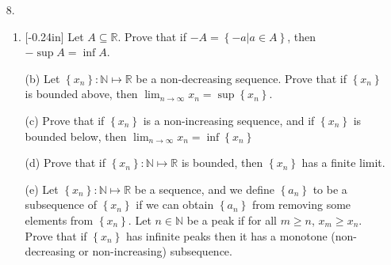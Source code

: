 \documentclass[letterpaper,12pt]{article}
\newcommand{\set}[1]{\left\{ #1 \right\}}
\theoremstyle{definition}
\begin{document}
\pagebreak
\begin{enumerate}
    \item[8.] \begin{enumerate}
    \item\reversemarginpar{}[-0.24in]   Let $A \subseteq \mathbb{R}$. Prove that if $-A = \set{-a | a \in A}$, then $-\sup A = \inf A$. 
\end{enumerate}
\end{enumerate}
\pagebreak
\begin{enumerate}
   \item[] \begin{enumerate}
       \item[(b)] Let $\set{x_n} : \mathbb{N} \mapsto \mathbb{R}$ be a non-decreasing sequence. Prove that if $\set{x_n}$ is bounded above, then $\lim_{n \rightarrow \infty} x_n = \sup \set{x_n}$. 
   \end{enumerate}
\end{enumerate}
\pagebreak
\begin{enumerate}
\item[]
\begin{enumerate}
    \item[(c)] Prove that if $\set{x_n}$ is a non-increasing sequence, and if $\set{x_n}$ is bounded below, then $\lim_{n \rightarrow \infty} x_n = \inf \set{x_n}$
   \end{enumerate}
\end{enumerate}
\pagebreak
\begin{enumerate}
    \item[] \begin{enumerate}
        \item[(d)] Prove that if $\set{x_n} : \mathbb{N} \mapsto \mathbb{R}$ is bounded, then $\set{x_n}$ has a finite limit.
    \end{enumerate}
\end{enumerate}
\pagebreak
\begin{enumerate}
    \item[] \begin{enumerate}
        \item[(e)] Let $\set{x_n} : \mathbb{N} \mapsto \mathbb{R}$ be a sequence, and we define $\set{a_n}$ to be a subsequence of $\set{x_n}$ if we can obtain $\set{a_n}$ from removing some elements from $\set{x_n}$. Let $n \in \mathbb{N}$ be a peak if for all $m \geq n$, $x_m \geq x_n$. Prove that if $\set{x_n}$ has infinite peaks then it has a monotone (non-decreasing or non-increasing) subsequence. 
    \end{enumerate}
\end{enumerate}
\end{document}
